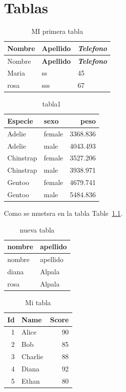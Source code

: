 \documentclass[
  letterpaper,
  11pt,
  english,
  doublespacing,
  headsepline,
  consistentlayout,
  oneside,
  openany]{MastersDoctoralThesis}
\begin{document}
\chapter{Tablas}\label{tablas}

\begin{longtable}[]{@{}lll@{}}
\caption{MI primera tabla}\tabularnewline
\toprule\noalign{}
Nombre & \textbf{Apellido} & \textbf{\emph{Telefono}} \\
\midrule\noalign{}
\endfirsthead
\toprule\noalign{}
Nombre & \textbf{Apellido} & \textbf{\emph{Telefono}} \\
\midrule\noalign{}
\endhead
\bottomrule\noalign{}
\endlastfoot
Maria & ss & 45 \\
rosa & sss & 67 \\
\end{longtable}

\begin{longtable}[]{@{}llr@{}}

\caption{\label{tbl-ping}tabla1}

\tabularnewline

\toprule\noalign{}
Especie & sexo & peso \\
\midrule\noalign{}
\endhead
\bottomrule\noalign{}
\endlastfoot
Adelie & female & 3368.836 \\
Adelie & male & 4043.493 \\
Chinstrap & female & 3527.206 \\
Chinstrap & male & 3938.971 \\
Gentoo & female & 4679.741 \\
Gentoo & male & 5484.836 \\

\end{longtable}

Como se muetsra en la tabla Table~\ref{tbl-ping}.

\begin{longtable}[]{@{}ll@{}}
\caption{nueva tabla}\tabularnewline
\toprule\noalign{}
nombre & apellido \\
\midrule\noalign{}
\endfirsthead
\toprule\noalign{}
nombre & apellido \\
\midrule\noalign{}
\endhead
\bottomrule\noalign{}
\endlastfoot
diana & Alpala \\
rosa & Alpala \\
\end{longtable}

\begin{table}
\centering
\caption{Mi tabla}
\centering
\begin{tabular}[t]{rlr}
\toprule
Id & Name & Score\\
\midrule
1 & Alice & 90\\
2 & Bob & 85\\
3 & Charlie & 88\\
4 & Diana & 92\\
5 & Ethan & 80\\
\bottomrule
\end{tabular}
\end{table}
\end{document}

